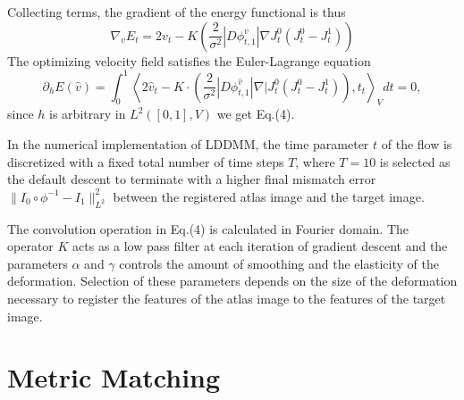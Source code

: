 \documentclass{article}
\theoremstyle{definition}
\theoremstyle{plain}
\begin{document}
Collecting terms, the gradient of the energy functional is thus
\begin{equation*}
    \nabla_vE_t=2v_t-K\left(\frac{2}{\sigma^2}|D\phi^v_{t,1}|\nabla J^0_t(J^0_t-J^1_t)\right )
\end{equation*}
The optimizing velocity field satisfies the Euler-Lagrange equation
\begin{equation*}
    \partial_hE(\hat{v})=\int^1_0\left<2\hat{v}_t-K\cdot\left(\frac{2}{\sigma^2}|D\phi^\hat{v}_{t,1}|\nabla|J^0_t(J^0_t-J^1_t)\right),t_t\right>_Vdt=0,
\end{equation*}
since $h$ is arbitrary in $L^2([0,1],V)$ we get Eq.(4).

In the numerical implementation of LDDMM, the time parameter $t$ of the flow is discretized with a fixed total number of time steps $T$, where $T=10$ is selected as the default descent to terminate with a higher final mismatch error $\|I_0\circ\phi^{-1}-I_1\|^2_{L^2}$ between the registered atlas image and the target image. 

The convolution operation in Eq.(4) is calculated in Fourier domain. The operator $K$ acts as a low pass filter at each iteration of gradient descent and the parameters $\alpha$ and $\gamma$ controls the amount of smoothing and the elasticity of the deformation. Selection of these parameters depends on the size of the deformation necessary to register the features of the atlas image to the features of the target image.

\section{Metric Matching}
\end{document}
